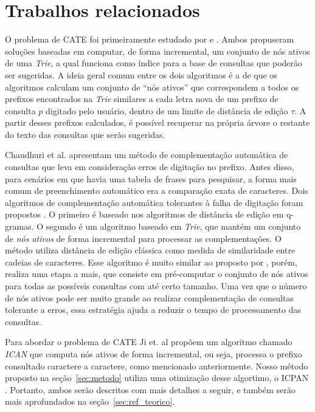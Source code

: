 \chapter{Trabalhos relacionados}\label{sec:referencias}
\label{sec:related_work}

O problema de CATE foi primeiramente estudado por \cite{chaudhuri2009extending} e \cite{ji2009efficient}. Ambos propuseram soluções baseadas em computar, de forma incremental, um conjunto de nós ativos de uma \textit{Trie}, a qual funciona como índice para a base de consultas que poderão ser sugeridas. A ideia geral comum entre os dois algoritmos é a de que os algoritmos calculam um conjunto de ``nós ativos'' que correspondem a todos os prefixos encontrados na \textit{Trie} similares a cada letra nova de um prefixo de consulta $p$ digitado pelo usuário, dentro de um limite de distância de edição $\tau$. A partir desses prefixos calculados, é possível recuperar na própria árvore o restante do texto das consultas que serão sugeridas.

Chaudhuri et al. \cite{chaudhuri2009extending} apresentam um método de complementação automática de consultas que leva em consideração erros de digitação no prefixo. Antes disso, para cenários em que havia uma tabela de frases para pesquisar, a forma mais comum de preenchimento automático era a comparação exata de caracteres. Dois algoritmos de complementação automática tolerantes à falha de digitação foram propostos \citep{chaudhuri2009extending}. O primeiro é baseado nos algoritmos de distância de edição em q-gramas\citep{arasu2006efficient, chaudhuri2006primitive, xiao2008ed}. O segundo é um algoritmo baseado em \textit{Trie}, que mantém um conjunto de \textit{nós ativos} de forma incremental para processar as complementações. O método utiliza distância de edição clássica como medida de similaridade entre cadeias de caracteres. Esse algoritmo é muito similar ao proposto por \cite{ji2009efficient}, porém, realiza uma etapa a mais, que consiste em pré-computar o conjunto de nós ativos para todas as possíveis consultas com até certo tamanho. Uma vez que o número de nós ativos pode ser muito grande ao realizar complementação de consultas tolerante a erros, essa estratégia ajuda a reduzir o tempo de processamento das consultas.

Para abordar o problema de CATE Ji et. al \citep{ji2009efficient} propõem um algoritmo chamado \textit{ICAN} que computa nós ativos de forma incremental, ou seja, processa o prefixo consultado caractere a caractere, como mencionado anteriormente. Nosso método proposto na seção~\ref{sec:metodo} utiliza uma otimização desse algortimo, o ICPAN \citep{li2011efficient}. Portanto, ambos serão descritos com mais detalhes a seguir, e também serão mais aprofundados na seção~\ref{sec:ref_teorico}. 

